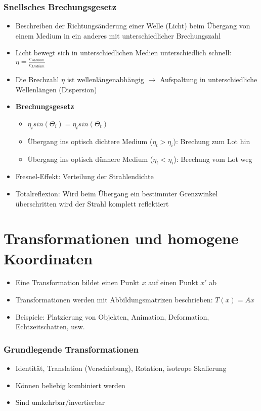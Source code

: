 \subsubsection{Snellsches Brechungsgesetz}
\begin{itemize}
	\item Beschreiben der Richtungsänderung einer Welle (Licht) beim Übergang von einem Medium in ein anderes mit unterschiedlicher Brechungszahl
	\item Licht bewegt sich in unterschiedlichen Medien unterschiedlich schnell: \(\eta = \frac{c_{Vakuum}}{c_{Medium}}\)
	\item Die Brechzahl \(\eta\) ist wellenlängenabhängig \(\rightarrow\) Aufspaltung in unterschiedliche Wellenlängen (Dispersion)
	\item \textbf{Brechungsgesetz}
	\begin{itemize}
		\item \(\eta_i sin(\Theta_i) = \eta_t sin(\Theta_t)\)
		\item Übergang ins optisch dichtere Medium (\(\eta_t > \eta_i\)): Brechung zum Lot hin
		\item Übergang ins optisch dünnere Medium (\(\eta_t < \eta_i\)): Brechung vom Lot weg
	\end{itemize}
	\item Fresnel-Effekt: Verteilung der Strahlendichte
	\item Totalreflexion: Wird beim Übergang ein bestimmter Grenzwinkel überschritten wird der Strahl komplett reflektiert
\end{itemize}



\section{Transformationen und homogene Koordinaten}
\begin{itemize}
	\item Eine Transformation bildet einen Punkt \(x\) auf einen Punkt \(x'\) ab
	\item Transformationen werden mit Abbildungsmatrizen beschrieben: \(T(x) = Ax\)
	\item Beispiele: Platzierung von Objekten, Animation, Deformation, Echtzeitschatten, usw.
\end{itemize}

\subsubsection{Grundlegende Transformationen}
\begin{itemize}
	\item Identität, Translation (Verschiebung), Rotation, isotrope Skalierung
	\item Können beliebig kombiniert werden
	\item Sind umkehrbar/invertierbar
\end{itemize}

